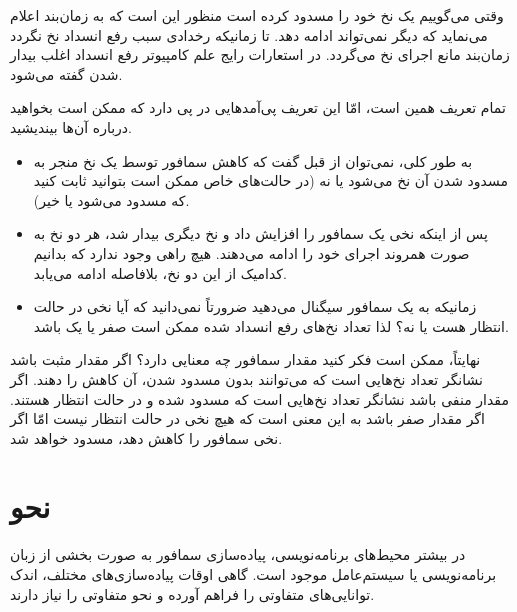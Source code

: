 \documentclass{book}
\begin{document}
    وقتی می‌گوییم یک نخ خود را مسدود کرده است 
    منظور این است که به زمان‌بند اعلام می‌نماید که دیگر نمی‌تواند ادامه دهد. 
    تا زمانیکه رخدادی سبب رفع انسداد نخ نگردد زمان‌بند مانع اجرای نخ می‌گردد. 
    در استعارات رایج علم کامپیوتر رفع انسداد اغلب بیدار شدن گفته می‌شود.

    تمام تعریف همین است،‌  
    امّا این تعریف پی‌آمدهایی در پی دارد که ممکن است بخواهید درباره آن‌ها بیندیشید. 

\begin{itemize}

\item 
    به طور کلی، نمی‌توان از قبل گفت که کاهش سمافور توسط یک نخ منجر به مسدود شدن آن نخ می‌شود یا نه 
    (در حالت‌های خاص ممکن است بتوانید ثابت کنید که مسدود می‌شود یا خیر).


\item 
    پس از اینکه نخی یک سمافور را افزایش داد و نخ دیگری بیدار شد، هر دو نخ به صورت همروند اجرای خود را ادامه می‌دهند. 
    هیچ راهی وجود ندارد که بدانیم کدامیک از این دو نخ، بلافاصله ادامه می‌یابد. 

\item 
    زمانیکه به یک سمافور سیگنال می‌دهید ضرورتاً نمی‌دانید که آیا نخی در حالت انتظار هست یا نه؟ لذا تعداد نخ‌های رفع انسداد شده ممکن است 
    صفر یا یک باشد. 

\end{itemize}

    نهایتاً، ممکن است فکر کنید مقدار سمافور چه معنایی دارد؟ 
    اگر مقدار مثبت باشد نشانگر تعداد نخ‌هایی است که می‌توانند بدون مسدود شدن، آن کاهش را دهند.
    اگر مقدار منفی باشد نشانگر تعداد نخ‌هایی است که مسدود شده و در حالت انتظار هستند. 
    اگر مقدار صفر باشد به این معنی است که هیچ نخی در حالت انتظار نیست امّا اگر نخی سمافور را کاهش دهد، مسدود خواهد شد.
    

\section{نحو}

    در بیشتر محیط‌های برنامه‌نویسی، پیاده‌سازی سمافور به صورت بخشی از زبان برنامه‌نویسی یا سیستم‌عامل موجود است. 
    گاهی اوقات پیاده‌سازی‌های مختلف،‌ اندک توانایی‌های متفاوتی را فراهم آورده و نحو متفاوتی را نیاز دارند.
\end{document}
